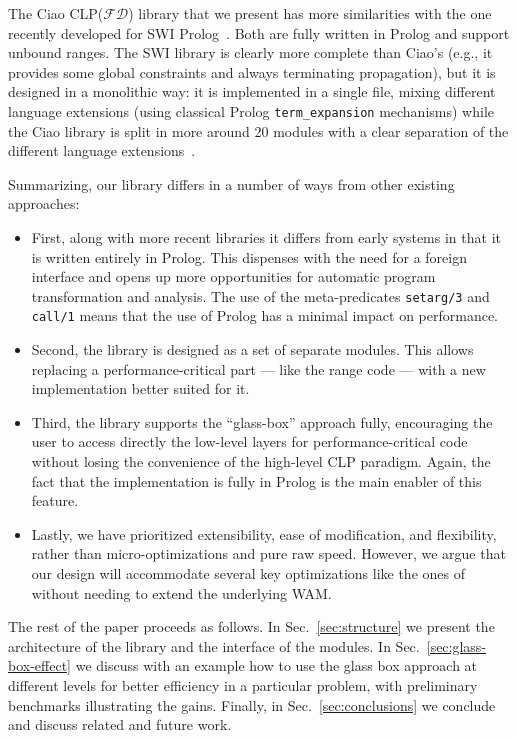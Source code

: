 \documentclass{llncs}
\newcommand{\clpfd}{CLP($\mathcal{FD}$)\xspace}
\begin{document}
The Ciao \clpfd library that we present has more similarities with the
one recently developed for SWI
Prolog~\cite{springerlink:10.1007/978-3-642-29822-6_24}. Both are
fully written in Prolog and support unbound ranges. The SWI library is
clearly more complete than Ciao's (e.g., it provides some global
constraints and always terminating propagation), but it is designed in
a monolithic way: it is implemented in a single file, mixing different
language extensions (using classical Prolog \verb!term_expansion!
mechanisms) while the Ciao library is split in more around 20 modules
with a clear separation of the different language
extensions~\cite{composing-extensions-lopstr-11}.

Summarizing, our library differs in a number of ways from other
existing approaches:
\begin{itemize}
\item First, along with more recent libraries it differs from early
  systems in that it is written entirely in Prolog. This dispenses
  with the need for a foreign interface and opens up more
  opportunities for automatic program transformation and analysis.
  The use of the meta-predicates \verb!setarg/3! and \verb!call/1!
  means that the use of Prolog has a minimal impact on performance.
\item Second, the library is designed as a set of separate
  modules. This allows replacing a performance-critical part --- like the
  range code --- with a new implementation better suited for it.
\item Third, the library supports the ``glass-box'' approach fully,
  encouraging the user to access directly the low-level layers for
  performance-critical code without losing the convenience of the
  high-level CLP paradigm. Again, the fact that the implementation is
  fully in Prolog is the main enabler of this feature.
\item Lastly, we have prioritized extensibility, ease of modification,
  and flexibility, rather than micro-optimizations and pure raw
  speed. However, we argue that our design will accommodate several
  key optimizations like the ones of~\cite{wam-fd-iclp-diaz} without
  needing to extend the underlying WAM.
\end{itemize}

The rest of the paper proceeds as follows. In Sec.~\ref{sec:structure}
we present the architecture of the library and the interface of the
modules. In Sec.~\ref{sec:glass-box-effect} we discuss with an example
how to use the glass box approach at different levels for better
efficiency in a particular problem, with preliminary benchmarks
illustrating the gains. Finally, in Sec.~\ref{sec:conclusions} we
conclude and discuss related and future work.
\end{document}
